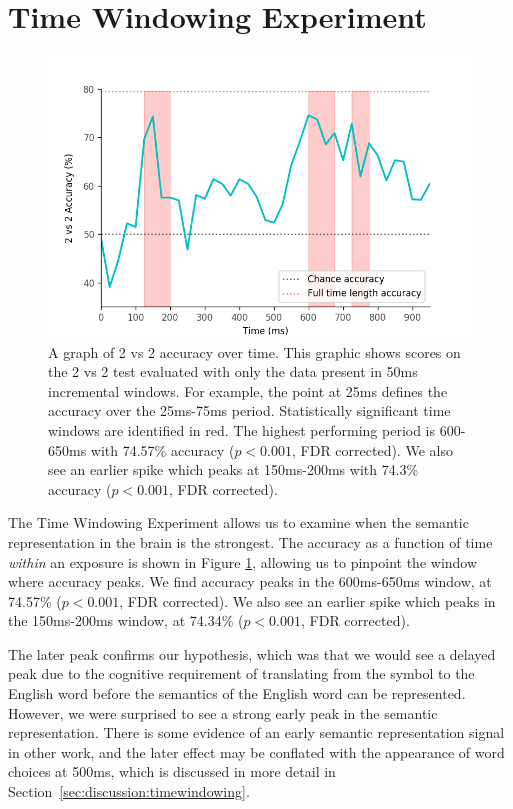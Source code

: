 \section{Time Windowing Experiment}
\label{sec:results:timewindowing}

\begin{figure}[t]
  \centering
  \includegraphics[width=0.75\linewidth]{figures/timewindow}
  \caption[\tvt Accuracy over Time]{
    A graph of 2 vs 2 accuracy over time. This graphic shows scores on the 2 vs 
    2 test evaluated with only the data present in 50ms incremental windows.  
    For example, the point at 25ms defines the \tvt accuracy over the 25ms-75ms 
    period. Statistically significant time windows are identified in red. The 
    highest performing period is 600-650ms with 74.57\% accuracy ($p < 0.001$, 
    FDR corrected). We also see an earlier spike which peaks at 150ms-200ms 
    with 74.3\% accuracy ($p < 0.001$, FDR corrected).
  }
  \label{fig:timewindow}
\end{figure}

The Time Windowing Experiment allows us to examine when the semantic 
representation in the brain is the strongest. The \tvt accuracy as a function 
of time \emph{within} an exposure is shown in Figure \ref{fig:timewindow}, 
allowing us to pinpoint the window where accuracy peaks. We find accuracy peaks 
in the 600ms-650ms window, at 74.57\% ($p < 0.001$, FDR corrected). We also see 
an earlier spike which peaks in the 150ms-200ms window, at 74.34\% ($p < 
0.001$, FDR corrected).

The later peak confirms our hypothesis, which was that we would see a delayed
peak due to the cognitive requirement of translating from the symbol to the 
English word before the semantics of the English word can be represented.  
However, we were surprised to see a strong early peak in the semantic 
representation. There is some evidence of an early semantic representation 
signal in other work, and the later effect may be conflated with the appearance 
of word choices at 500ms, which is discussed in more detail in 
Section~\ref{sec:discussion:timewindowing}.
